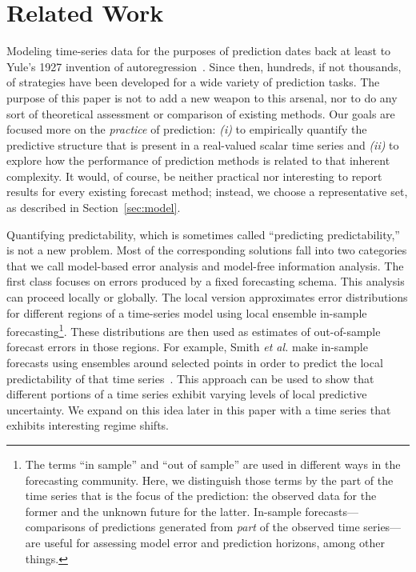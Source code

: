 \section{Related Work }\label{sec:related}

Modeling time-series data for the purposes of prediction dates back at
least to Yule's 1927 invention of autoregression~\cite{Yule27}.  Since
then, hundreds, if not thousands, of strategies have been developed
for a wide variety of prediction tasks.  The purpose of this paper is
not to add a new weapon to this arsenal, nor to do any sort of
theoretical assessment or comparison of existing methods.  Our goals
are focused more on the \emph{practice} of prediction: \emph{(i)} \alert{to
empirically quantify the predictive structure that is present in a
real-valued scalar time series} and \emph{(ii)} to explore how the
performance of prediction methods is related to that inherent
complexity.  It would, of course, be neither practical nor interesting
to report results for every existing forecast method; instead, we
choose a representative set, as described in Section~\ref{sec:model}.

Quantifying predictability, which is sometimes called ``predicting
predictability,'' is not a new problem.  Most of the corresponding
solutions fall into two categories that we call model-based error
analysis and model-free information analysis.
%
%
%
The first class focuses on errors produced by a fixed forecasting
schema.  This analysis can proceed locally or globally.  The local
version approximates error distributions for different regions of a
time-series model using local ensemble in-sample
forecasting\footnote{The terms ``in sample'' and ``out of sample'' are
  used in different ways in the forecasting community.  Here, we
  distinguish those terms by the part of the time series that is the
  focus of the prediction: the observed data for the former and the
  unknown future for the latter.  In-sample forecasts---comparisons of
  predictions generated from \emph{part} of the observed time
  series---are useful for assessing model error and prediction
  horizons, among other things.}.
%
These distributions are then used as estimates of out-of-sample
forecast errors in those regions.  For example, Smith \emph{et al.}
make in-sample forecasts using ensembles around selected points in
order to predict the local predictability of that time
series~\cite{Smith199250}.  This approach can be used to show that
different portions of a time series exhibit varying levels of
local predictive uncertainty.  We expand on this idea later in this
paper with a time series that exhibits interesting regime shifts.

